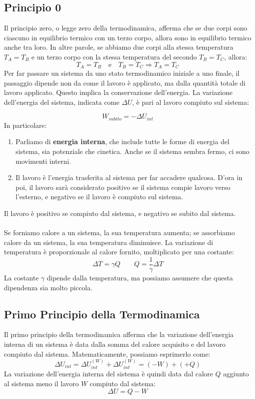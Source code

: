 \documentclass{article}
\begin{document}
\subsection{Principio 0}
Il principio zero, o legge zero della termodinamica, afferma che se due corpi sono ciascuno in equilibrio termico con un terzo corpo, allora sono in equilibrio termico anche tra loro. In altre parole, se abbiamo due corpi alla stessa temperatura \(T_A = T_B\) e un terzo corpo con la stessa temperatura del secondo \(T_B = T_C\), allora:
\[
    T_A = T_B \quad \text{e} \quad T_B = T_C \Rightarrow T_A = T_C
\]
Per far passare un sistema da uno stato termodinamico iniziale a uno finale, il passaggio dipende non da come il lavoro è applicato, ma dalla quantità totale di lavoro applicato. Questo implica la conservazione dell'energia. La variazione dell'energia del sistema, indicata come \(\Delta U\), è pari al lavoro compiuto sul sistema:

\[W_{subito} = - \Delta U_{int}\]
In particolare:
\begin{enumerate}
    \item Parliamo di \textbf{energia interna}, che include tutte le forme di energia del sistema, sia potenziale che cinetica. Anche se il sistema sembra fermo, ci sono movimenti interni.
    \item Il lavoro è l'energia trasferita al sistema per far accadere qualcosa. D'ora in poi, il lavoro sarà considerato positivo se il sistema compie lavoro verso l'esterno, e negativo se il lavoro è compiuto sul sistema.
\end{enumerate}
Il lavoro è positivo se compiuto dal sistema, e negativo se subito dal sistema.\\
\\
Se forniamo calore a un sistema, la sua temperatura aumenta; se assorbiamo calore da un sistema, la sua temperatura diminuisce. La variazione di temperatura è proporzionale al calore fornito, moltiplicato per una costante:
\[
    \Delta T = \gamma Q \qquad Q = \frac{1}{\gamma} \Delta T
\]
La costante \(\gamma\) dipende dalla temperatura, ma possiamo assumere che questa dipendenza sia molto piccola.
\subsection{Primo Principio della Termodinamica}
Il primo principio della termodinamica afferma che la variazione dell'energia interna di un sistema è data dalla somma del calore acquisito e del lavoro compiuto dal sistema. Matematicamente, possiamo esprimerlo come:
\[
    \Delta U_{int} = \Delta U_{int}^{(W)} + \Delta U_{int}^{(W)} 
                   = (-W) + (+Q)
\]
La variazione dell'energia interna del sistema è quindi data dal calore \(Q\) aggiunto al sistema meno il lavoro \(W\) compiuto dal sistema:
\[
    \Delta U = Q - W
\]
\end{document}
